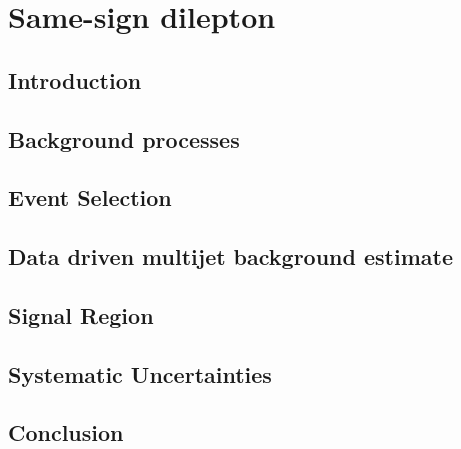 \chapter{Same-sign dilepton}
\label{chap:SS}
\section{Introduction}

\section{Background processes}
\label{sec:wprimeBackgrounds}

\section{Event Selection}
\label{sec:wprimeEventSelection}

\section{Data driven multijet background estimate}
\label{sec:wprimeMultijetBackground}

\section{Signal Region}
\label{sec:wprimeSignalRegion}

\section{Systematic Uncertainties}
\label{sec:wprimeSystematics}

\section{Conclusion}
\label{sec:wprimeConclusion}

